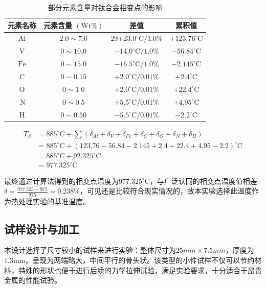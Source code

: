 \begin{table}[htbp]
	\centering
	\caption{部分元素含量对钛合金相变点的影响}
	\label{sec:chem4ti}
	\begin{tabular}{cccc}
		\hline 元素名称 & 元素含量 $(\mathrm{Wt} \%)$ & 差值&累积值 \\
		\hline $\mathrm{Al}$ & $2.0 \sim 7.0$ & 29+$23.0^{\circ} \mathrm{C} / 1.0 \%$ & $+123.76^{\circ} \mathrm{C}$ \\
		$\mathrm{V}$ & $0 \sim 10.0$ & $-14.0^{\circ} \mathrm{C} / 1.0 \%$ & $-56.84^{\circ} \mathrm{C}$ \\
		$\mathrm{Fe}$ & $0 \sim 15.0$ & $-16.5^{\circ} \mathrm{C} / 1.0 \%$ & $-2.145^{\circ} \mathrm{C}$
		\\
		$\mathrm{C}$ & $0 \sim 0.15$ & $+2.0^{\circ} \mathrm{C} / 0.01 \%$ &$ +2.4^{\circ} \mathrm{C} $\\
		$\mathrm{O}$ & $0 \sim 1.0$ & $+2.0^{\circ} \mathrm{C} / 0.01 \%$& $ +22.4^{\circ} \mathrm{C} $\\
		$\mathrm{~N}$ & $0 \sim 0.5$ & $+5.5^{\circ} \mathrm{C} / 0.01 \%$& $ +4.95^{\circ} \mathrm{C} $\\
		$\mathrm{H}$ & $0 \sim 0.50$ & $-5.5^{\circ} \mathrm{C} / 0.01 \%$ &$ -2.2^{\circ} \mathrm{C} $\\
		\hline
	\end{tabular}
\end{table}

\begin{equation}
	\begin{aligned}
		T_\beta&=885^{\circ} \mathrm{C}+\sum (\delta_{Al}+\delta_{V}+\delta_{Fe}+\delta_{C}+\delta_{O}+\delta_{N}+\delta_{H})\\
		&= 885^{\circ} \mathrm{C}+(123.76-56.84-2.145+2.4+22.4+4.95-2.2)^{\circ} \mathrm{C}\\
		&=885^{\circ} \mathrm{C}+92.325^{\circ} \mathrm{C}\\
		&=977.325^{\circ} \mathrm{C}
	\end{aligned}
\end{equation}

最终通过计算法得到的相变点温度为$977.325^{\circ} \mathrm{C} $，与广泛认同的相变点温度值相差$\delta=\frac{977.325-975}{975}=0.238\% $，可见还是比较符合现实情况的，故本实验选择此温度作为热处理实验的基准温度。


\subsection{试样设计与加工}
本设计选择了尺寸较小的试样来进行实验：整体尺寸为$ 25mm\times 7.5mm $，厚度为1.3mm，呈现为两端略大，中间平行的骨头状。该类型的小件试样不仅可以节约材料，特殊的形状也便于进行后续的力学拉伸试验，满足实验要求，十分适合于昂贵金属的性能试验。

